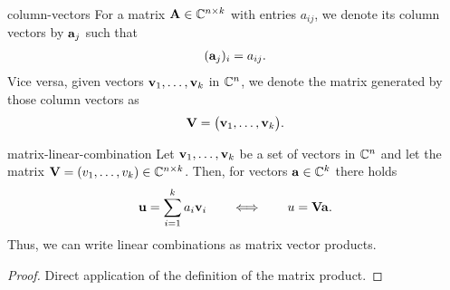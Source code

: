 \begin{Notation}{column-vectors}
  For a matrix $\mathbf A\in \mathbb C^{n\times k}$ with entries $a_{ij}$, we denote its column vectors by $\mathbf a_j$ such that
  \begin{gather}
      (\mathbf a_j)_i = a_{ij}.
  \end{gather}
  Vice versa, given vectors $\mathbf v_1,\dots,\mathbf v_k$ in $\mathbb C^n$, we denote the matrix generated by those column vectors as
  \begin{gather}
      \mathbf V = \bigl( \mathbf v_1,\dots,\mathbf v_k\bigr).
  \end{gather}
\end{Notation}

\begin{Lemma}{matrix-linear-combination}
  Let $\mathbf v_1,\dots,\mathbf v_k$ be a set of vectors in $\mathbb C^n$ and let the matrix $\mathbf V=(v_1,\dots,v_k) \in \mathbb C^{n\times k}$. Then, for vectors $\mathbf a\in\mathbb C^k$ there holds
  \begin{gather}
      \mathbf u = \sum_{i=1}^k a_i \mathbf v_i
      \qquad \Longleftrightarrow \qquad
      u = \mathbf V \mathbf a.
  \end{gather}
  Thus, we can write linear combinations as matrix vector products.
\end{Lemma}

\begin{proof}
  Direct application of the definition of the matrix product.
\end{proof}


